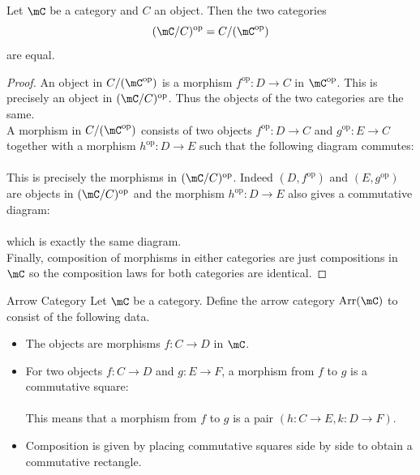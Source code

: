 \documentclass[a4paper]{article}
\begin{document}
\begin{prp}{}{} Let $\mC$ be a category and $C$ an object. Then the two categories $$(\mC/C)^\text{op}=C/(\mC^\text{op})$$ are equal. 
\begin{proof}
An object in $C/(\mC^\text{op})$ is a morphism $f^\text{op}:D\to C$ in $\mC^\text{op}$. This is precisely an object in $(\mC/C)^\text{op}$. Thus the objects of the two categories are the same. \\

A morphism in $C/(\mC^\text{op})$ consists of two objects $f^\text{op}:D\to C$ and $g^\text{op}:E\to C$ together with a morphism $h^\text{op}:D\to E$ such that the following diagram commutes: \\
\\
This is precisely the morphisms in $(\mC/C)^\text{op}$. Indeed $(D,f^\text{op})$ and $(E,g^\text{op})$ are objects in $(\mC/C)^\text{op}$ and the morphism $h^\text{op}:D\to E$ also gives a commutative diagram: \\
\\
which is exactly the same diagram. \\

Finally, composition of morphisms in either categories are just compositions in $\mC$ so the composition laws for both categories are identical. 
\end{proof}
\end{prp}

\begin{defn}{Arrow Category}{} Let $\mC$ be a category. Define the arrow category $\text{Arr}(\mC)$ to consist of the following data. 
\begin{itemize}
\item The objects are morphisms $f:C\to D$ in $\mC$. 
\item For two objects $f:C\to D$ and $g:E\to F$, a morphism from $f$ to $g$ is a commutative square: \\
\\
This means that a morphism from $f$ to $g$ is a pair $(h:C\to E,k:D\to F)$. 
\item Composition is given by placing commutative squares side by side to obtain a commutative rectangle. 
\end{itemize}
\end{defn}
\end{document}
